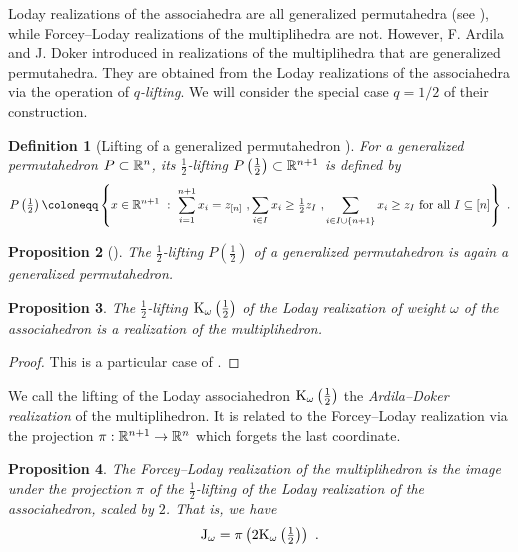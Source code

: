 \documentclass[twoside, 11pt]{amsart}
\newtheorem{definition}{Definition}[section]
\newtheorem{proposition}[definition]{Proposition}
\theoremstyle{remark}
\begin{document}
Loday realizations of the associahedra are all generalized permutahedra (see \cite[Corollary 8.2]{Postnikov09}), while Forcey--Loday realizations of the multiplihedra are not. 
However, F. Ardila and J. Doker introduced in \cite{AD13} realizations of the multiplihedra that are generalized permutahedra. 
They are obtained from the Loday realizations of the associahedra via the operation of \emph{$q$-lifting}. 
We will consider the special case $q=1/2$ of their construction.

\begin{definition}[Lifting of a generalized permutahedron {\cite[Definition 2.3]{AD13}}]
For a generalized permutahedron $P\subset \mathbb{R}^n$, its \emph{$\tfrac{1}{2}$-lifting} $P \left(\tfrac{1}{2}\right) \subset \mathbb{R}^{n+1}$ is defined by 
\[P \left(\tfrac{1}{2}\right) \coloneqq \left\{ x \in \RR^{n+1} \ : \ 
\sum_{i=1}^{n+1} x_i = z_{[n]} \ , 
\sum_{i \in I} x_i \geq \tfrac{1}{2}z_I \ ,
\sum_{i \in I \cup \{n+1\}} x_i \geq z_I 
\text{ for all } I \subseteq [n] \right\} \ . \]
\end{definition}

\begin{proposition}[{\cite[Proposition 2.4]{AD13}}] 
The $\tfrac{1}{2}$-lifting $P \left(\tfrac{1}{2}\right)$ of a generalized permutahedron is again a generalized permutahedron. 
\end{proposition}

\begin{proposition} 
The $\tfrac{1}{2}$-lifting $\mathrm{K}_\omega\left(\tfrac{1}{2}\right)$ of the Loday realization of weight $\omega$ of the associahedron is a realization of the multiplihedron. 
\end{proposition}
\begin{proof} 
This is a particular case of \cite[Corollary 4.10]{AD13}.
\end{proof}

We call the lifting of the Loday associahedron $\mathrm{K}_\omega\left(\tfrac{1}{2}\right)$ the\emph{ Ardila--Doker realization} of the multiplihedron. It is related to the Forcey--Loday realization via the projection $\pi: \mathbb{R}^{n+1} \to \mathbb{R}^n$ which forgets the last coordinate. 
 
\begin{proposition} 
\label{prop:lifting} 
The Forcey--Loday realization of the multiplihedron is the image under the projection $\pi$ of the $\tfrac{1}{2}$-lifting of the Loday realization of the associahedron, scaled by $2$. 
That is, we have  \[ \mathrm{J}_\omega = \pi \left(2 \mathrm{K}_\omega\left(\tfrac{1}{2}\right)\right) \ . \]
\end{proposition}
\end{document}
